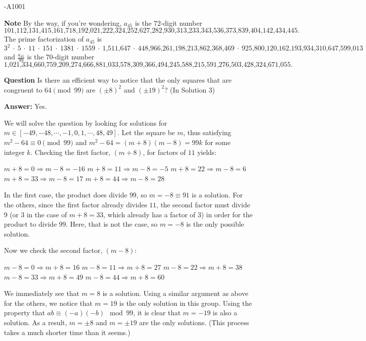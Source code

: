 \begin{enumerate}
 -A1001

 \textbf{Note} By the way, if you're wondering, $a_{45}$ is the $72$-digit number 
 \[101\text{,}112\text{,}131\text{,}415\text{,}161\text{,}718\text{,}192\text{,}021\text{,}222\text{,}324\text{,}252\text{,}627\text{,}282\text{,}930\text{,}313\text{,}233\text{,}343\text{,}536\text{,}373\text{,}839\text{,}404\text{,}142\text{,}434\text{,}445.\] The prime factorization of $a_{45}$ is 
 \[3^{2}~\cdot~5~\cdot~11~\cdot~151~\cdot~1381~\cdot~1559~\cdot~1\text{,}511\text{,}647~\cdot~448\text{,}966\text{,}261\text{,}198\text{,}213\text{,}862\text{,}368\text{,}469~\cdot~925\text{,}800\text{,}120\text{,}162\text{,}193\text{,}934\text{,}310\text{,}647\text{,}599\text{,}013\] and $\frac{a_{45}}{99}$ is the $70$-digit number 
 \[1\text{,}021\text{,}334\text{,}660\text{,}759\text{,}209\text{,}274\text{,}666\text{,}881\text{,}033\text{,}578\text{,}309\text{,}366\text{,}494\text{,}245\text{,}588\text{,}215\text{,}591\text{,}276\text{,}503\text{,}428\text{,}324\text{,}671\text{,}055.\]

 


 \textbf{Question} Is there an efficient way to notice that the only squares that are congruent to $64 \pmod {99}$ are $(\pm 8)^2$ and $(\pm 19)^2$?  (In Solution 3)

 \textbf{Answer:} Yes.

 We will solve the question by looking for solutions for $m\in[-49,-48,\cdots,-1,0,1,\cdots,48,49]$. Let the square be $m$, thus satisfying $m^2-64\equiv 0\pmod{99}$  and $m^2-64=(m+8)(m-8)=99k$ for some integer $k$. Checking the first factor, $(m+8)$, for factors of $11$ yields:

 $m+8=0\Rightarrow m-8=-16$
$m+8=11\Rightarrow m-8=-5$
$m+8=22\Rightarrow m-8=6$
$m+8=33\Rightarrow m-8=17$
$m+8=44\Rightarrow m-8=28$

 In the first case, the product does divide $99$, so $m=-8\equiv91$ is a solution. For the others, since the first factor already divides $11$, the second factor must divide $9$ (or $3$ in the case of $m+8=33$, which already has a factor of $3$) in order for the product to divide $99$. Here, that is not the case, so $m=-8$ is the only possible solution.

 Now we check the second factor, $(m-8)$:

 $m-8=0\Rightarrow m+8=16$
$m-8=11\Rightarrow m+8=27$
$m-8=22\Rightarrow m+8=38$
$m-8=33\Rightarrow m+8=49$
$m-8=44\Rightarrow m+8=60$

 We immediately see that $m=8$ is a solution. Using a similar argument as above for the others, we notice that $m=19$ is the only solution in this group. Using the property that $ab\equiv(-a)(-b)\mod99$, it is clear that $m=-19$ is also a solution. As a result, $m=\pm8$ and $m=\pm19$ are the only solutions. (This process takes a much shorter time than it seems.)


\end{enumerate}
